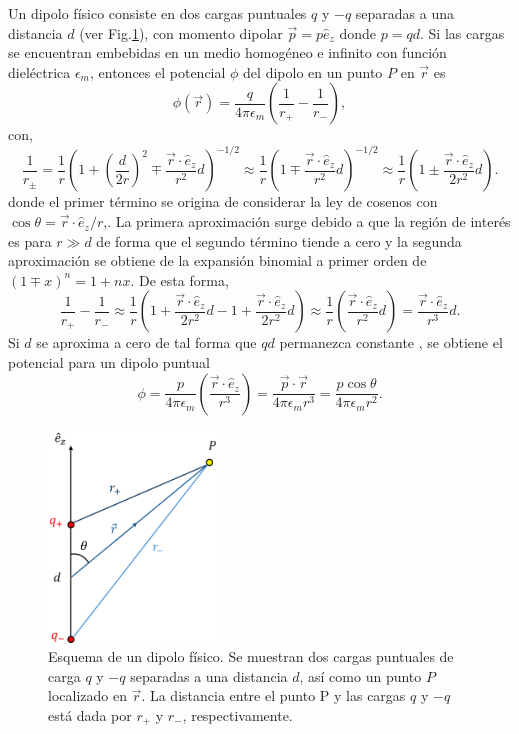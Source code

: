 Un dipolo físico consiste en dos cargas puntuales $q$ y $-q$ separadas a una distancia $d$ (ver Fig.\ref{dipolo_elec}), con momento dipolar $\Vec{p}=p\hat{e}_z$ donde $p=qd$. Si las cargas se encuentran embebidas en un medio homogéneo e infinito con función dieléctrica $\epsilon_m$, entonces el potencial $\phi$ del dipolo en un punto $P$ en $\Vec{r}$ es \cite{Bohren,Griffiths}
\begin{equation}
    \phi(\Vec{r})=\frac{q}{4\pi\epsilon_m}\left(\frac{1}{r_+}-\frac{1}{r_{-}}\right),    
\end{equation}
con,
\begin{equation*}
  \frac{1}{r_{\pm}}=\frac{1}{r}\left(1+\left(\frac{d}{2r}\right)^2\mp \frac{\Vec{r}\cdot\hat{e}_z}{r^2}d\right)^{-1/2}   \approx\frac{1}{r}\left(1\mp \frac{\Vec{r}\cdot\hat{e}_z}{r^2}d\right)^{-1/2}\approx\frac{1}{r}\left(1\pm \frac{\Vec{r}\cdot\hat{e}_z}{2r^2}d\right).  
\end{equation*}
donde el primer término se origina de considerar la ley de cosenos con $\cos\theta=\Vec{r}\cdot\hat{e}_z/r$,. La primera aproximación surge debido a que la región de interés es para $r\gg d$ de forma que el segundo término tiende a cero y la segunda aproximación se obtiene de la expansión binomial a primer orden de $(1\mp x)^n=1+nx$.
De esta forma,
\begin{equation}
    \frac{1}{r_+}-\frac{1}{r_{-}}\approx\frac{1}{r}\left(1+ \frac{\Vec{r}\cdot\hat{e}_z}{2r^2}d-1+ \frac{\Vec{r}\cdot\hat{e}_z}{2r^2}d\right)\approx\frac{1}{r}\left( \frac{\Vec{r}\cdot\hat{e}_z}{r^2}d\right)=\frac{\Vec{r}\cdot\hat{e}_z}{r^3}d.    
\end{equation}
Si $d$ se aproxima a cero de tal forma que $qd$ permanezca constante \cite{Bohren}, se obtiene el potencial para un dipolo puntual
\begin{equation}
\phi=\frac{p}{4\pi\epsilon_m}\left(\frac{\Vec{r}\cdot\hat{e}_z}{r^3}\right)=\frac{\Vec{p}\cdot\Vec{r}}{4\pi\epsilon_m r^3}=\frac{p\cos\theta}{4\pi\epsilon_m r^2}.
\label{pot_dipolo}
\end{equation}

\begin{figure}[h!]
	\centering
	\includegraphics[width=4.5cm]{../../Figuras/dipolo}
	\caption{Esquema de un dipolo físico. Se muestran dos cargas puntuales de carga $q$ y $-q$ separadas a una distancia $d$, así como un punto $P$ localizado en $\Vec{r}$. La distancia entre el punto P y las cargas $q$ y $-q$ está dada por $r_+$ y $r_{-}$, respectivamente. }
	\label{dipolo_elec}
\end{figure}

